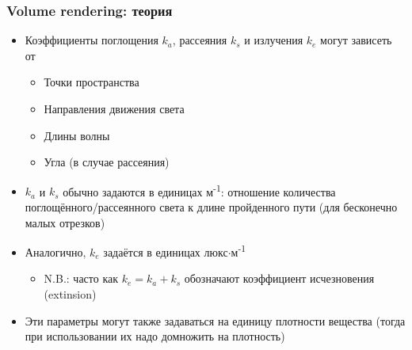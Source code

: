 \documentclass[10pt]{beamer}
\begin{document}
\begin{frame}[fragile]
\frametitle{Volume rendering: теория}
\begin{itemize}
\item Коэффициенты поглощения \begin{math}k_a\end{math}, рассеяния \begin{math}k_s\end{math} и излучения \begin{math}k_e\end{math} могут зависеть от
\pause
\begin{itemize}
\item Точки пространства
\pause
\item Направления движения света
\pause
\item Длины волны
\pause
\item Угла (в случае рассеяния)
\end{itemize}
\pause
\item \begin{math}k_a\end{math} и \begin{math}k_s\end{math} обычно задаются в единицах м\textsuperscript{-1}: отношение количества поглощённого/рассеянного света к длине пройденного пути (для бесконечно малых отрезков)
\pause
\item Аналогично, \begin{math}k_e\end{math} задаётся в единицах люкс\begin{math}\cdot\end{math}м\textsuperscript{-1}
\pause
\begin{itemize}
\item N.B.: часто как \begin{math}k_e = k_a + k_s\end{math} обозначают коэффициент исчезновения (extinsion)
\end{itemize}
\pause
\item Эти параметры могут также задаваться на единицу плотности вещества (тогда при использовании их надо домножить на плотность)
\end{itemize}
\end{frame}
\end{document}
